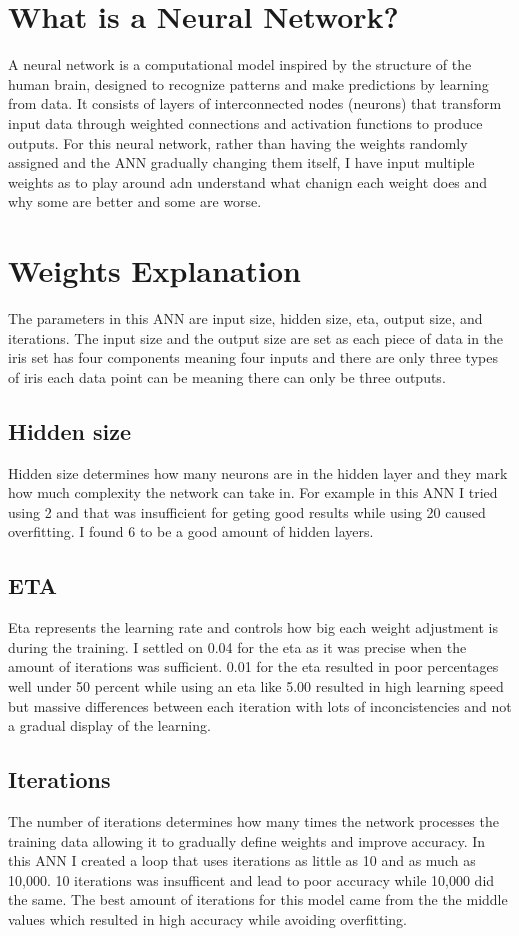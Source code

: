 \documentclass{article}
\begin{document}
\section{What is a Neural Network?}

A neural network is a computational model inspired by the structure of the human brain, designed to recognize patterns and make predictions by learning from data. It consists of layers of interconnected nodes (neurons) that transform input data through weighted connections and activation functions to produce outputs. For this neural network, rather than having the weights randomly assigned and the ANN gradually changing them itself, I have input multiple weights as to play around adn understand what chanign each weight does and why some are better and some are worse.

\section{Weights Explanation}
The parameters in this ANN are input size, hidden size, eta, output size, and iterations. The input size and the output size are set as each piece of data in the iris set has four components meaning four inputs and there are only three types of iris each data point can be meaning there can only be three outputs. 
\subsection{Hidden size} 
Hidden size determines how many neurons are in the hidden layer and they mark how much complexity the network can take in. For example in this ANN I tried using 2 and that was insufficient for geting good results while using 20 caused overfitting. I found 6 to be a good amount of hidden layers.
\subsection{ETA} 
Eta represents the learning rate and controls how big each weight adjustment is during the training. I settled on 0.04 for the eta as it was precise when the amount of iterations was sufficient. 0.01 for the eta resulted in poor percentages well under 50 percent while using an eta like 5.00 resulted in high learning speed but massive differences between each iteration with lots of inconcistencies and not a gradual display of the learning. 
\subsection{Iterations} 
The number of iterations determines how many times the network processes the training data allowing it to gradually define weights and improve accuracy. In this ANN I created a loop that uses iterations as little as 10 and as much as 10,000. 10 iterations was insufficent and lead to poor accuracy while 10,000 did the same. The best amount of iterations for this model came from the the middle values which resulted in high accuracy while avoiding overfitting.
\end{document}
